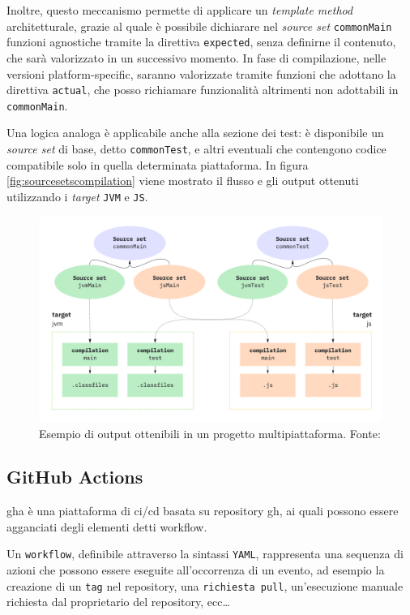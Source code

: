 \documentclass[12pt,a4paper,openright,twoside]{book}
\begin{document}
Inoltre, questo meccanismo permette di applicare un \textit{template method} architetturale, grazie al quale è possibile dichiarare nel \textit{
    source set
} \texttt{commonMain} funzioni agnostiche 
tramite la direttiva \texttt{expected}, senza definirne il contenuto, che sarà valorizzato in un successivo momento.
In fase di compilazione, nelle versioni platform-specific, saranno valorizzate tramite funzioni che adottano la direttiva \texttt{actual},
che posso richiamare funzionalità altrimenti non adottabili in \texttt{commonMain}.

Una logica analoga è applicabile anche alla sezione dei test: è disponibile un \textit{source set} di base, detto \texttt{commonTest}, e altri
eventuali che contengono codice compatibile solo in quella determinata piattaforma.
In figura \ref{fig:sourcesetscompilation} viene mostrato il flusso e gli output ottenuti utilizzando i \textit{target} \texttt{JVM} e \texttt{JS}.

\begin{figure}[H]
    \centering
     \includegraphics[width=1\linewidth]{figures/sourcesetscompilation.png}
     \caption{Esempio di output ottenibili in un progetto multipiattaforma. Fonte: \cite{WebsiteKotlinMultiPlatformCompilations}}
    \label{fig:targets}
 \end{figure}

\subsection{GitHub Actions}
 \ac{gha} è una piattaforma di \ac{ci}/\ac{cd} basata su repository \ac{gh},
 ai quali possono essere agganciati degli elementi detti workflow.

 Un \texttt{workflow}, definibile attraverso la sintassi \texttt{YAML}, rappresenta una sequenza di azioni che possono essere eseguite
 all'occorrenza di un evento, ad esempio la creazione di un \texttt{tag} nel repository,
 una \texttt{richiesta pull}, un'esecuzione manuale richiesta dal proprietario del repository, ecc\dots
\end{document}
